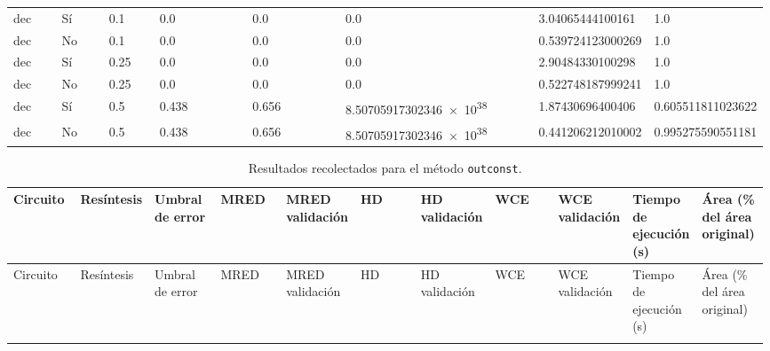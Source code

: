 {{\begin{longtable}{M{0.09\linewidth}M{0.09\linewidth}M{0.09\linewidth}M{0.09\linewidth}M{0.09\linewidth}M{0.09\linewidth}M{0.09\linewidth}M{0.09\linewidth}M{0.09\linewidth}M{0.09\linewidth}M{0.09\linewidth}}
dec & Sí & \num{0.1} & \num{0.0} &   & \num{0.0} &   & \num{0.0} &   & \num{3.04065444100161} & \num{1.0} \\
dec & No & \num{0.1} & \num{0.0} &   & \num{0.0} &   & \num{0.0} &   & \num{0.539724123000269} & \num{1.0} \\
dec & Sí & \num{0.25} & \num{0.0} &   & \num{0.0} &   & \num{0.0} &   & \num{2.90484330100298} & \num{1.0} \\
dec & No & \num{0.25} & \num{0.0} &   & \num{0.0} &   & \num{0.0} &   & \num{0.522748187999241} & \num{1.0} \\
dec & Sí & \num{0.5} & \num{0.438} &   & \num{0.656} &   & \num{8.50705917302346e+38} &   & \num{1.87430696400406} & \num{0.605511811023622} \\
dec & No & \num{0.5} & \num{0.438} &   & \num{0.656} &   & \num{8.50705917302346e+38} &   & \num{0.441206212010002} & \num{0.995275590551181} \\

  \end{longtable}

\clearpage

  \begin{longtable}{M{0.09\linewidth}M{0.09\linewidth}M{0.09\linewidth}M{0.09\linewidth}M{0.09\linewidth}M{0.09\linewidth}M{0.09\linewidth}M{0.09\linewidth}M{0.09\linewidth}M{0.09\linewidth}M{0.09\linewidth}}

    \caption{Resultados recolectados para el método \texttt{outconst}.}
    \label{tab:outconst_full_results}\\

    \toprule
    Circuito  & Resíntesis & Umbral de error & MRED & MRED validación & HD & HD validación & WCE & WCE validación & Tiempo de ejecución (\si{\second}) & Área (\% del área original) \\
    \midrule
    \endfirsthead

    \toprule
    Circuito  & Resíntesis & Umbral de error & MRED & MRED validación & HD & HD validación & WCE & WCE validación & Tiempo de ejecución (\si{\second}) & Área (\% del área original) \\
    \midrule
    \endhead

    \midrule
    \endfoot

    \bottomrule
    \endlastfoot


\end{longtable}}}
